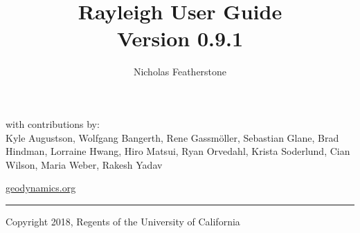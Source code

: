\documentclass[10pt, letterpaper]{article}
\begin{document}
{%
\null
\vspace{17em}
\color{dark_grey}
{\fontfamily{\sfdefault}\selectfont
\large
\vspace{0.58in}
\noindent with contributions by: \\
    Kyle Augustson, Wolfgang Bangerth, Rene Gassm\"oller, Sebastian Glane, Brad Hindman, Lorraine Hwang, Hiro Matsui, Ryan Orvedahl, Krista Soderlund, Cian Wilson, Maria Weber, Rakesh Yadav
    \\
\vspace{1.0em}

{\noindent
{\href{https://geodynamics.org}{geodynamics.org}}
}
}


{\noindent
\color{dark_grey}
\rule{\textwidth}{2pt}
}

\textcopyright Copyright 2018, Regents of the University of California

}

\pagebreak
{}
\renewcommand{\abstractname}{Overview}


\title{Rayleigh User Guide \\ Version 0.9.1}
\author{Nicholas Featherstone}

\maketitle
\end{document}
